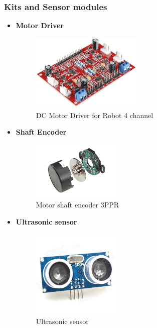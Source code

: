 \documentclass[12pt]{article}
\begin{document}
\subsubsection{Kits and Sensor modules}
\begin{itemize}
	\item \textbf{Motor Driver}\\
	\begin{figure}[H]
		\centering
		\includegraphics[width =0.5\textwidth]{Fig/Electronics/motor-driver.jpg}
		\caption{DC Motor Driver for Robot 4 channel}
		\label{fig:motor-driver}
	\end{figure}

	\item \textbf{Shaft Encoder}\\
	\begin{figure}[H]
		\centering
		\includegraphics[width =0.4\textwidth]{Fig/Electronics/encoder.png}
		\caption{Motor shaft encoder 3PPR}
		\label{fig:encoder}
	\end{figure}
	
	\item \textbf{Ultrasonic sensor}\\
	\begin{figure}[H]
		\centering
		\includegraphics[width =0.4\textwidth]{Fig/Electronics/ultrasonic.jpg}
		\caption{Ultrasonic sensor}
		\label{fig:ultrasonic}
	\end{figure}
	

\end{itemize}
\end{document}
